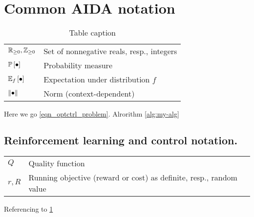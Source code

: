 \documentclass[12pt,twoside]{../../mitthesis}
\begin{document}
\section{Common AIDA notation}

\begin{table}
\caption{Table caption}
\label{table:my-table}
\begin{tabularx}{0.97\textwidth}{ |p{}|p{}| }  
\hline
$\R_{\ge 0}, \Z_{\ge 0}$ & Set of nonnegative reals, resp., integers \\ 
$\PP{\bullet}$ & Probability measure \\
$\E[f]{\bullet}$ & Expectation under distribution $f$ \\
$\nrm{\bullet}$ & Norm (context-dependent) \\
\hline
\end{tabularx}
\end{table}
Here we go \eqref{eqn_optctrl_problem}. Alrorithm \ref{alg:my-alg}

\subsection{Reinforcement learning and control notation.}
\begin{tabularx}{0.97\textwidth}{ |p{}|p{}| }  
\hline
$Q$ & Quality function \\ 
$r, R$ & Running objective (reward or cost) as definite, resp., random value\\
\hline
\end{tabularx}


Referencing to \ref{table:my-table}
\end{document}
